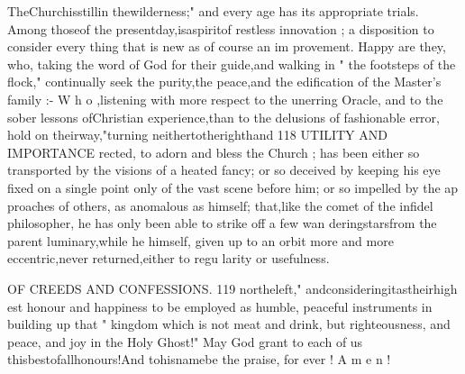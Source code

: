 \documentclass[
]{book}
\begin{document}
TheChurchisstillin thewilderness;"
and every age has its appropriate trials.
Among thoseof the presentday,isaspiritof
restless innovation ; a disposition to consider
every thing that is new as of course an im
provement. Happy are they, who, taking
the word of God for their guide,and walking
in " the footsteps of the flock," continually seek the purity,the peace,and the edification
of the Master's family :- W h o ,listening with more respect to the unerring Oracle, and to the sober lessons ofChristian experience,than to the delusions of fashionable error, hold on
theirway,"turning neithertotherighthand
118 UTILITY AND IMPORTANCE
rected, to adorn and bless the Church ; has been either so transported by the visions of a
heated fancy; or so deceived by keeping his eye fixed on a single point only of the vast scene before him; or so impelled by the ap proaches of others, as anomalous as himself;
that,like the comet of the infidel philosopher, he has only been able to strike off a few wan deringstarsfrom the parent luminary,while he himself, given up to an orbit more and more eccentric,never returned,either to regu larity or usefulness.

OF CREEDS AND CONFESSIONS.
119
northeleft," andconsideringitastheirhigh est honour and happiness to be employed as
humble, peaceful instruments in building up
that " kingdom which is not meat and drink,
but righteousness, and peace, and joy in the
Holy Ghost!" May God grant to each of us thisbestofallhonours!And tohisnamebe
the praise, for ever ! A m e n !
\end{document}
